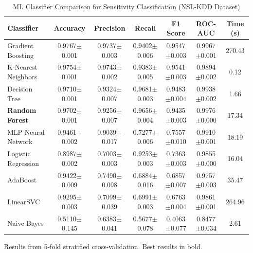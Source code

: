 
\begin{table}[htbp]
\centering
\caption{ML Classifier Comparison for Sensitivity Classification (NSL-KDD Dataset)}
\label{tab:ml_ablation}
\begin{tabular}{lcccccc}
\toprule
\textbf{Classifier} & \textbf{Accuracy} & \textbf{Precision} & \textbf{Recall} & \textbf{F1 Score} & \textbf{ROC-AUC} & \textbf{Time (s)} \\
\midrule
Gradient Boosting & 0.9767$\pm$0.001 & 0.9737$\pm$0.003 & 0.9402$\pm$0.006 & 0.9547$\pm$0.003 & 0.9967$\pm$0.001 & 270.43 \\
K-Nearest Neighbors & 0.9754$\pm$0.001 & 0.9743$\pm$0.002 & 0.9383$\pm$0.005 & 0.9541$\pm$0.003 & 0.9894$\pm$0.002 & 0.12 \\
Decision Tree & 0.9710$\pm$0.001 & 0.9324$\pm$0.007 & 0.9681$\pm$0.003 & 0.9483$\pm$0.004 & 0.9938$\pm$0.002 & 1.66 \\
\textbf{Random Forest} & 0.9702$\pm$0.001 & 0.9256$\pm$0.007 & 0.9656$\pm$0.004 & 0.9435$\pm$0.003 & 0.9976$\pm$0.000 & 17.34 \\
MLP Neural Network & 0.9461$\pm$0.002 & 0.9039$\pm$0.017 & 0.7277$\pm$0.006 & 0.7557$\pm$0.010 & 0.9910$\pm$0.001 & 18.19 \\
Logistic Regression & 0.8987$\pm$0.002 & 0.7003$\pm$0.003 & 0.9253$\pm$0.003 & 0.7363$\pm$0.003 & 0.9855$\pm$0.000 & 16.04 \\
AdaBoost & 0.9422$\pm$0.009 & 0.7490$\pm$0.098 & 0.6884$\pm$0.016 & 0.6857$\pm$0.007 & 0.9757$\pm$0.003 & 35.47 \\
LinearSVC & 0.9295$\pm$0.003 & 0.7099$\pm$0.039 & 0.6991$\pm$0.003 & 0.6763$\pm$0.004 & 0.9861$\pm$0.001 & 264.96 \\
Naive Bayes & 0.5110$\pm$0.145 & 0.6383$\pm$0.041 & 0.5677$\pm$0.078 & 0.4063$\pm$0.077 & 0.8477$\pm$0.034 & 2.61 \\
\bottomrule
\end{tabular}
\begin{tablenotes}
\small
\item Results from 5-fold stratified cross-validation. Best results in bold.
\end{tablenotes}
\end{table}
